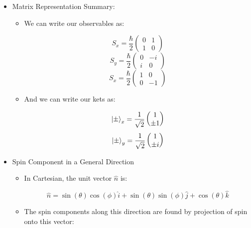 \begin{itemize}
\begin{itemize}
\begin{itemize}
\begin{itemize}
            \end{itemize}

        \end{itemize}

    \end{itemize}

  \item Matrix Representation Summary:

    \begin{itemize}

      \item We can write our observables as:

        $$S_x=\frac{\hbar}{2}\left(\begin{matrix} 0 & 1\\ 1 & 0 \end{matrix}\right)$$
        $$S_y=\frac{\hbar}{2}\left(\begin{matrix}0 & -i\\ i & 0 \end{matrix}\right)$$
        $$S_x=\frac{\hbar}{2}\left(\begin{matrix}1 & 0\\ 0 & -1 \end{matrix}\right)$$

      \item And we can write our kets as:

        $$\ket{\pm}_x=\frac{1}{\sqrt{2}}\left( \begin{matrix}1\\\pm1\end{matrix} \right)$$
        $$\ket{\pm}_y=\frac{1}{\sqrt{2}}\left( \begin{matrix}1\\\pm i\end{matrix} \right)$$

    \end{itemize}

  \item Spin Component in a General Direction

    \begin{itemize}

      \item In Cartesian, the unit vector $\hat{n}$ is:

        $$\hat{n}=\sin(\theta)\cos(\phi)\hat{i}+\sin(\theta)\sin(\phi)\hat{j}+\cos(\theta)\hat{k}$$

      \item The spin components along this direction are found by projection of spin onto this vector:


\end{itemize}
\end{itemize}
